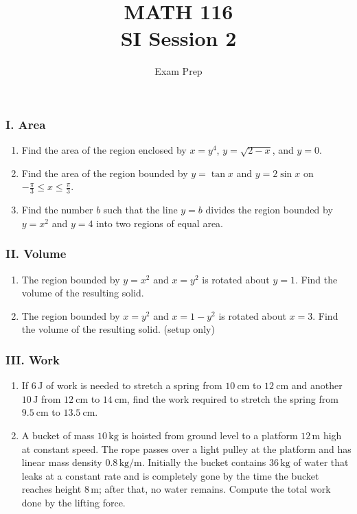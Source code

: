 \documentclass[12pt]{article}
\begin{document}

\title{MATH 116 \\ SI Session 2}
\author{Exam Prep}

\maketitle

\subsubsection*{I. Area}
\begin{enumerate}
  \item Find the area of the region enclosed by \(x=y^4\), \(y=\sqrt{2-x}\), and \(y=0\).
  \item Find the area of the region bounded by \(y=\tan x\) and \(y=2\sin x\) on \(-\tfrac{\pi}{3}\le x\le \tfrac{\pi}{3}\).
  \item Find the number \(b\) such that the line \(y=b\) divides the region bounded by \(y=x^2\) and \(y=4\) into two regions of equal area.
\end{enumerate}

\subsubsection*{II. Volume}
\begin{enumerate}
  \item The region bounded by \(y=x^2\) and \(x=y^2\) is rotated about \(y=1\). Find the volume of the resulting solid.
  \item The region bounded by \(x=y^2\) and \(x=1-y^2\) is rotated about \(x=3\). Find the volume of the resulting solid. (setup only)
\end{enumerate}

\subsubsection*{III. Work}
\begin{enumerate}
  \item If \(6\,\mathrm{J}\) of work is needed to stretch a spring from \(10\ \mathrm{cm}\) to \(12\ \mathrm{cm}\) and another \(10\,\mathrm{J}\) from \(12\ \mathrm{cm}\) to \(14\ \mathrm{cm}\), find the work required to stretch the spring from \(9.5\ \mathrm{cm}\) to \(13.5\ \mathrm{cm}\).
  \item A bucket of mass \(10\,\mathrm{kg}\) is hoisted from ground level to a platform \(12\,\mathrm{m}\) high at constant speed. The rope passes over a light pulley at the platform and has linear mass density \(0.8\,\mathrm{kg/m}\). Initially the bucket contains \(36\,\mathrm{kg}\) of water that leaks at a constant rate and is completely gone by the time the bucket reaches height \(8\,\mathrm{m}\); after that, no water remains. Compute the total work done by the lifting force.
\end{enumerate}
\end{document}
